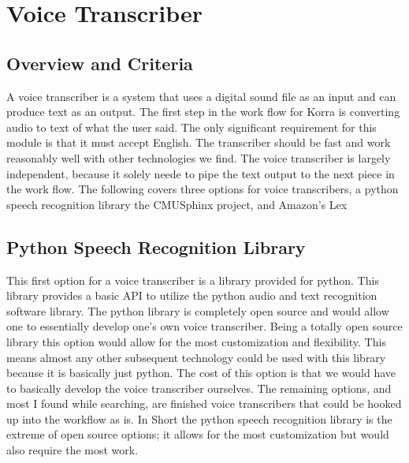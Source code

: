 \documentclass[onecolumn, draftclsnofoot,10pt, compsoc]{IEEEtran}
\begin{document}
\section{Voice Transcriber}
	\subsection{Overview and Criteria}
    A voice transcriber is a system that uses a digital sound file as an input and can produce text as an output.
    The first step in the work flow for Korra is converting audio to text of what the user said. 
    The only significant requirement for this module is that it must accept English.
    The transcriber should be fast and work reasonably well with other technologies we find. 
    The voice transcriber is largely independent, because it solely neede to pipe the text output to the next piece in the work flow.
    The following covers three options for voice transcribers, a python speech recognition library the CMUSphinx project, and Amazon's Lex
    
    \subsection{Python Speech Recognition Library}
    This first option for a voice transcriber is a library provided for python. 
    This library provides a basic API to utilize the python audio and text recognition software library. 
    The python library is completely open source and would allow one to essentially develop one’s own voice transcriber. 
    Being a totally open source library this option would allow for the most customization and flexibility. 
    This means almost any other subsequent technology could be used with this library because it is basically just python. 
    The cost of this option is that we would have to basically develop the voice transcriber ourselves. 
    The remaining options, and most I found while searching, are finished voice transcribers that could be hooked up into the workflow as is. 
    In Short the python speech recognition library is the extreme of open source options; it allows for the most customization but would also require the most work. 
    
\end{document}
